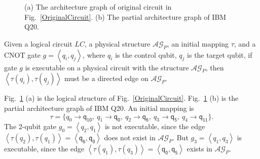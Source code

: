 \documentclass[runningheads]{llncs}
\begin{document}
\begin{figure}[h!]
\begin{center}
{
			}
\end{center}
	
	\caption{(a) The architecture graph of original circuit in Fig.~\ref{OriginalCircuit}. (b) The partial architecture graph of IBM Q20.}
	\label{LAGPAG}
\end{figure}
	

Given a logical circuit $LC$, a physical structure $\mathcal{AG}_{P}$, an initial mapping $\tau$, and a CNOT gate $g=\left \langle \textit{q}_\textit{i},\textit{q}_\textit{j}\right \rangle $, where $\textit{q}_\textit{i}$ is the control qubit, $\textit{q}_\textit{j}$ is the target qubit,
if gate $g$ is executable on a physical circuit with the structure $\mathcal{AG}_{P}$, then
$\left \langle\tau(\textit{q}_\textit{i}),\tau(\textit{q}_\textit{j})\right \rangle $ 
must be a directed edge on $\mathcal{AG}_{P}$.

\begin{example}
	Fig.~\ref{LAGPAG} (a) is the logical structure of Fig.~\ref{OriginalCircuit}. 
	Fig.~\ref{LAGPAG} (b) is the partial architecture graph of IBM Q20. An initial mapping is 
	$$\tau=\{\textit{q}_\textit{0}\rightarrow  \textsf{q}_{\textsf{10}},\ \textit{q}_\textit{1}\rightarrow \textsf{q}_{\textsf{0}},\ 
	\textit{q}_\textit{2}\rightarrow  \textsf{q}_{\textsf{6}},\ \textit{q}_\textit{3}\rightarrow  \textsf{q}_{\textsf{5}},\ \textit{q}_\textit{4}\rightarrow  \textsf{q}_{\textsf{11}}\} .$$
The 2-qubit gate	$g_{0}=\left \langle \textit{q}_\textit{2},\textit{q}_\textit{1}\right \rangle $ is not executable, since the edge $\left \langle \tau(\textit{q}_\textit{2}),\tau(\textit{q}_\textit{1})\right \rangle =\left \langle \textsf{q}_{\textsf{6}},\textsf{q}_{\textsf{0}}\right \rangle $ does not exist in $\mathcal{AG}_{P}$.
	But $g_{3}=\left \langle \textit{q}_\textit{1},\textit{q}_\textit{3}\right \rangle $ is executable, since 
	the edge $\left \langle \tau(\textit{q}_\textit{1}),\tau(\textit{q}_\textit{3})\right \rangle =\left \langle \textsf{q}_{\textsf{0}},\textsf{q}_{\textsf{5}}\right \rangle $  exists in $\mathcal{AG}_{P}$.
\end{example}
\end{document}
